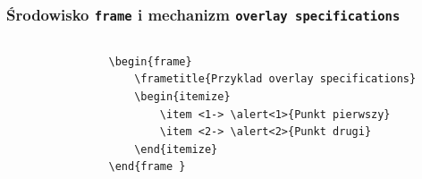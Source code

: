 \documentclass[t]{beamer}
\begin{document}
\begin{frame}[fragile]
	\frametitle{Środowisko \texttt{frame} i mechanizm \texttt{overlay specifications}}
	\begin{columns}[T]
		\begin{column}{.55\textwidth}
			\begin{lstlisting}
				\begin{frame}
					\frametitle{Przyklad overlay specifications}
					\begin{itemize}
						\item <1-> \alert<1>{Punkt pierwszy}
						\item <2-> \alert<2>{Punkt drugi}
					\end{itemize}
				\end{frame }
			\end{lstlisting}
		\end{column}
		\begin{column}{.4\textwidth}
			\\
		\end{column}		
	\end{columns}
\end{frame}
\end{document}
